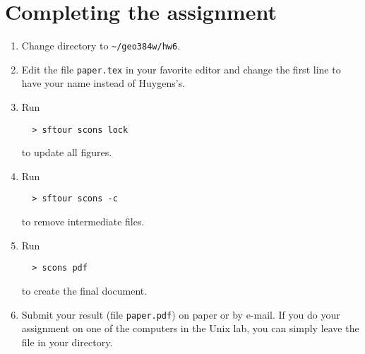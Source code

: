 \section{Completing the assignment}

\begin{enumerate}
\item Change directory to \verb#~/geo384w/hw6#.
\item Edit the file \texttt{paper.tex} in your favorite editor and change the
  first line to have your name instead of Huygens's.
\item Run
\begin{verbatim}
  > sftour scons lock
\end{verbatim}
to update all figures.
\item Run
\begin{verbatim}
  > sftour scons -c
\end{verbatim}
  to remove intermediate files.
\item Run
 \begin{verbatim} 
  > scons pdf
\end{verbatim}
  to create the final document.
\item Submit your result (file \texttt{paper.pdf}) on paper or by
  e-mail. If you do your assignment on one of the computers in the
  Unix lab, you can simply leave the file in your directory.
\end{enumerate}

 


